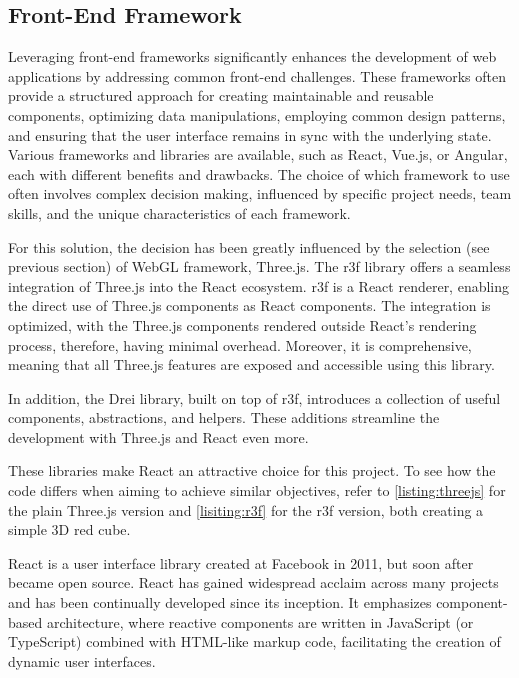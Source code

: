\subsection{Front-End Framework}

Leveraging front-end frameworks significantly enhances the development of web applications by addressing common front-end challenges. These frameworks often provide a structured approach for creating maintainable and reusable components, optimizing data manipulations, employing common design patterns, and ensuring that the user interface remains in sync with the underlying state. Various frameworks and libraries are available, such as React, Vue.js, or Angular, each with different benefits and drawbacks. The choice of which framework to use often involves complex decision making, influenced by specific project needs, team skills, and the unique characteristics of each framework. \cite{Gimeno2018} \cite{Pekarsky2020}

For this solution, the decision has been greatly influenced by the selection (see previous section) of WebGL framework, Three.js. The \acrfull{r3f} library offers a seamless integration of Three.js into the React ecosystem. \acrshort{r3f} is a React renderer, enabling the direct use of Three.js components as React components. The integration is optimized, with the Three.js components rendered outside React's rendering process, therefore, having minimal overhead. Moreover, it is comprehensive, meaning that all Three.js features are exposed and accessible using this library. \cite{R3F}

In addition, the Drei library, built on top of \acrshort{r3f}, introduces a collection of useful components, abstractions, and helpers. These additions streamline the development with Three.js and React even more. \cite{Drei}

These libraries make React an attractive choice for this project. To see how the code differs when aiming to achieve similar objectives, refer to \autoref{listing:threejs} for the plain Three.js version and \autoref{lisiting:r3f} for the \acrshort{r3f} version, both creating a simple 3D red cube.

React is a user interface library created at Facebook in 2011, but soon after became open source. React has gained widespread acclaim across many projects and has been continually developed since its inception. It emphasizes component-based architecture, where reactive components are written in JavaScript (or TypeScript) combined with HTML-like markup code, facilitating the creation of dynamic user interfaces. \cite{Banks2020}

